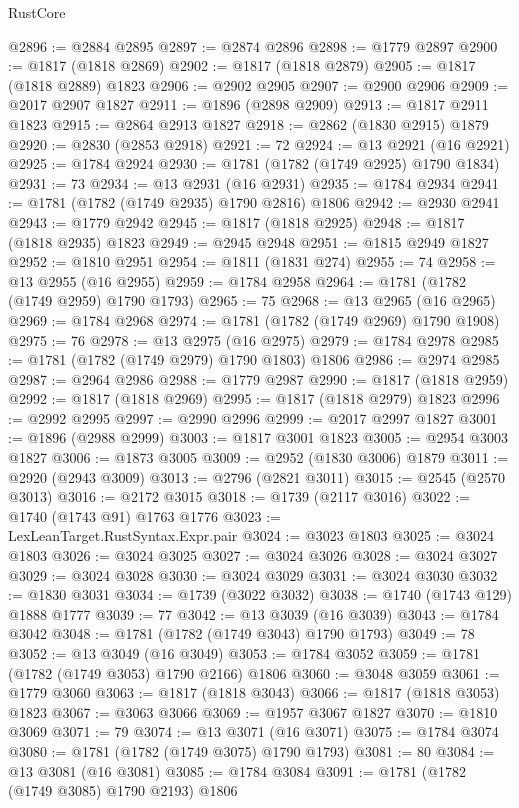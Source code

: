 \begin{lexlean}{RustCore}
\begin{coremodule}
@2896 := @2884 @2895
@2897 := @2874 @2896
@2898 := @1779 @2897
@2900 := @1817 (@1818 @2869)
@2902 := @1817 (@1818 @2879)
@2905 := @1817 (@1818 @2889) @1823
@2906 := @2902 @2905
@2907 := @2900 @2906
@2909 := @2017 @2907 @1827
@2911 := @1896 (@2898 @2909)
@2913 := @1817 @2911 @1823
@2915 := @2864 @2913 @1827
@2918 := @2862 (@1830 @2915) @1879
@2920 := @2830 (@2853 @2918)
@2921 := 72
@2924 := @13 @2921 (@16 @2921)
@2925 := @1784 @2924
@2930 := @1781 (@1782 (@1749 @2925) @1790 @1834)
@2931 := 73
@2934 := @13 @2931 (@16 @2931)
@2935 := @1784 @2934
@2941 := @1781 (@1782 (@1749 @2935) @1790 @2816) @1806
@2942 := @2930 @2941
@2943 := @1779 @2942
@2945 := @1817 (@1818 @2925)
@2948 := @1817 (@1818 @2935) @1823
@2949 := @2945 @2948
@2951 := @1815 @2949 @1827
@2952 := @1810 @2951
@2954 := @1811 (@1831 @274)
@2955 := 74
@2958 := @13 @2955 (@16 @2955)
@2959 := @1784 @2958
@2964 := @1781 (@1782 (@1749 @2959) @1790 @1793)
@2965 := 75
@2968 := @13 @2965 (@16 @2965)
@2969 := @1784 @2968
@2974 := @1781 (@1782 (@1749 @2969) @1790 @1908)
@2975 := 76
@2978 := @13 @2975 (@16 @2975)
@2979 := @1784 @2978
@2985 := @1781 (@1782 (@1749 @2979) @1790 @1803) @1806
@2986 := @2974 @2985
@2987 := @2964 @2986
@2988 := @1779 @2987
@2990 := @1817 (@1818 @2959)
@2992 := @1817 (@1818 @2969)
@2995 := @1817 (@1818 @2979) @1823
@2996 := @2992 @2995
@2997 := @2990 @2996
@2999 := @2017 @2997 @1827
@3001 := @1896 (@2988 @2999)
@3003 := @1817 @3001 @1823
@3005 := @2954 @3003 @1827
@3006 := @1873 @3005
@3009 := @2952 (@1830 @3006) @1879
@3011 := @2920 (@2943 @3009)
@3013 := @2796 (@2821 @3011)
@3015 := @2545 (@2570 @3013)
@3016 := @2172 @3015
@3018 := @1739 (@2117 @3016)
@3022 := @1740 (@1743 @91) @1763 @1776
@3023 := LexLeanTarget.RustSyntax.Expr.pair
@3024 := @3023 @1803
@3025 := @3024 @1803
@3026 := @3024 @3025
@3027 := @3024 @3026
@3028 := @3024 @3027
@3029 := @3024 @3028
@3030 := @3024 @3029
@3031 := @3024 @3030
@3032 := @1830 @3031
@3034 := @1739 (@3022 @3032)
@3038 := @1740 (@1743 @129) @1888 @1777
@3039 := 77
@3042 := @13 @3039 (@16 @3039)
@3043 := @1784 @3042
@3048 := @1781 (@1782 (@1749 @3043) @1790 @1793)
@3049 := 78
@3052 := @13 @3049 (@16 @3049)
@3053 := @1784 @3052
@3059 := @1781 (@1782 (@1749 @3053) @1790 @2166) @1806
@3060 := @3048 @3059
@3061 := @1779 @3060
@3063 := @1817 (@1818 @3043)
@3066 := @1817 (@1818 @3053) @1823
@3067 := @3063 @3066
@3069 := @1957 @3067 @1827
@3070 := @1810 @3069
@3071 := 79
@3074 := @13 @3071 (@16 @3071)
@3075 := @1784 @3074
@3080 := @1781 (@1782 (@1749 @3075) @1790 @1793)
@3081 := 80
@3084 := @13 @3081 (@16 @3081)
@3085 := @1784 @3084
@3091 := @1781 (@1782 (@1749 @3085) @1790 @2193) @1806

\end{coremodule}
\end{lexlean}

